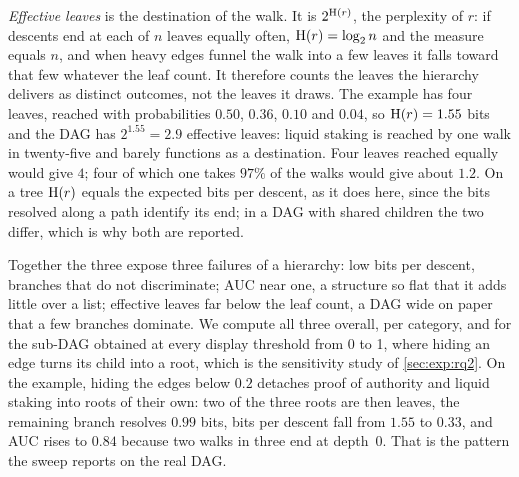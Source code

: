 \emph{Effective leaves} is the destination of the walk. It is $2^{\operatorname{H}(r)}$,
the perplexity of $r$: if descents end at each of $n$ leaves equally often,
$\operatorname{H}(r) = \log_2 n$ and the measure equals $n$, and when heavy edges
funnel the walk into a few leaves it falls toward that few whatever the leaf
count. It therefore counts the leaves the hierarchy delivers as distinct
outcomes, not the leaves it draws. The example has four leaves, reached with
probabilities $0.50$, $0.36$, $0.10$ and $0.04$, so $\operatorname{H}(r) = 1.55$ bits
and the DAG has $2^{1.55} = 2.9$ effective leaves: liquid staking is reached
by one walk in twenty-five and barely functions as a destination. Four leaves
reached equally would give $4$; four of which one takes $97\%$ of the walks
would give about $1.2$. On a tree $\operatorname{H}(r)$ equals the expected bits per
descent, as it does here, since the bits resolved along a path identify its
end; in a DAG with shared children the two differ, which is why both are
reported.

Together the three expose three failures of a hierarchy: low bits per
descent, branches that do not discriminate; AUC near one, a structure so flat
that it adds little over a list; effective leaves far below the leaf count, a
DAG wide on paper that a few branches dominate. We compute all three overall,
per category, and for the sub-DAG obtained at every display threshold from 0
to 1, where hiding an edge turns its child into a root, which is the
sensitivity study of \cref{sec:exp:rq2}. On the example, hiding the edges
below $0.2$ detaches proof of authority and liquid staking into roots of their
own: two of the three roots are then leaves, the remaining branch resolves
$0.99$ bits, bits per descent fall from $1.55$ to $0.33$, and AUC rises to
$0.84$ because two walks in three end at depth~0. That is the pattern the
sweep reports on the real DAG.

